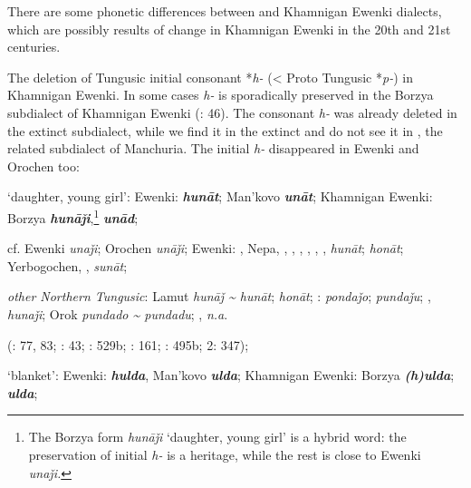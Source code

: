 \documentclass[output=paper,colorlinks,citecolor=brown]{langscibook}
\begin{document}
There are some phonetic differences between  and Khamnigan Ewenki dialects, which are possibly results of change in Khamnigan Ewenki in the 20th and 21st centuries.

\ea
The deletion of Tungusic initial consonant *\textit{h-} (< Proto Tungusic *\textit{p-}) in Khamnigan Ewenki. In some cases \textit{h-} is sporadically preserved in the Borzya subdialect of Khamnigan Ewenki (\citealt{Janhunen1991}: 46). The consonant \textit{h-} was already deleted in the extinct  subdialect, while we find it in the extinct  and do not see it in , the related subdialect of Manchuria. The initial \textit{h-} disappeared in  Ewenki and Orochen too:

\ea ‘daughter, young girl’:  Ewenki:  \textbf{\textit{hunāt}}; Man’kovo \textbf{\textit{unāt}}; Khamnigan Ewenki: Borzya \textbf{\textit{hunāǰi}},\footnote{The Borzya form \textit{hunāǰi} ‘daughter, young girl’ is a hybrid word: the preservation of initial \textit{h-} is a heritage, while the rest is close to  Ewenki \textit{unaǰi.}}  \textbf{\textit{unād}};

    cf.  Ewenki \textit{unaǰi}; Orochen \textit{unāǰi};  Ewenki: , Nepa, , , , , , ,  \textit{hunāt};  \textit{honāt}; Yerbogochen, ,  \textit{sunāt};

    \textit{other Northern Tungusic}: Lamut \textit{hunāǰ {\textasciitilde} hunāt};  \textit{honāt}; \textit{}:  \textit{pondaǰo};  \textit{pundaǰu}; ,  \textit{hunaǰi}; Orok \textit{pundado {\textasciitilde} pundadu}; ,  \textit{n.a}.
    
    (\citealt{Castrén1856}: 77, 83; \citealt{Janhunen1991}: 43; \citealt{Dorji1998}: 529b; \citealt{Chaoke2014a}: 161; \citealt{Vasilevic1958}: 495b; \citealt{Cincius1975B} 2: 347);

    \ex ‘blanket’:  Ewenki:  \textbf{\textit{hulda}}, Man’kovo \textbf{\textit{ulda}}; Khamnigan Ewenki: Borzya \textbf{\textit{(h)ulda}};  \textbf{\textit{ulda}};
\end{document}
